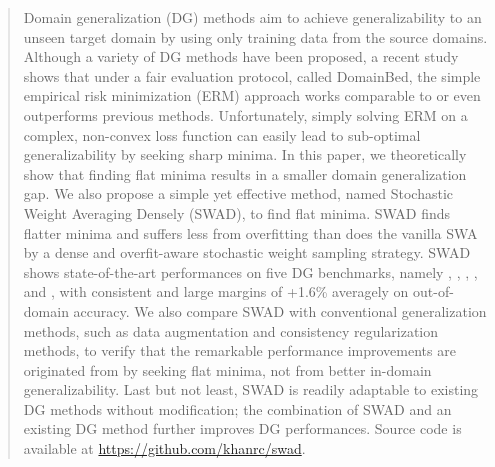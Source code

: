 \begin{abstract}
\vspace{-.5em}
Domain generalization (DG) methods aim to achieve generalizability to an unseen target domain by using only training data from the source domains.
Although a variety of DG methods have been proposed, a recent study shows that under a fair evaluation protocol, called DomainBed, the simple empirical risk minimization (ERM) approach works comparable to or even outperforms previous methods.
Unfortunately, simply solving ERM on a complex, non-convex loss function can easily lead to sub-optimal generalizability by seeking sharp minima.
In this paper, we theoretically show that finding flat minima results in a smaller domain generalization gap.
We also propose a simple yet effective method, named Stochastic Weight Averaging Densely (SWAD), to find flat minima.
SWAD finds flatter minima and suffers less from overfitting than does the vanilla SWA by a dense and overfit-aware stochastic weight sampling strategy.
SWAD shows state-of-the-art performances on five DG benchmarks, namely , , , , and , with consistent and large margins of +1.6\% averagely on out-of-domain accuracy.
We also compare SWAD with conventional generalization methods, such as data augmentation and consistency regularization methods, to verify that the remarkable performance improvements are originated from by seeking flat minima, not from better in-domain generalizability.
Last but not least, SWAD is readily adaptable to existing DG methods without modification; the combination of SWAD and an existing DG method further improves DG performances.
Source code is available at \url{https://github.com/khanrc/swad}.


\end{abstract}
